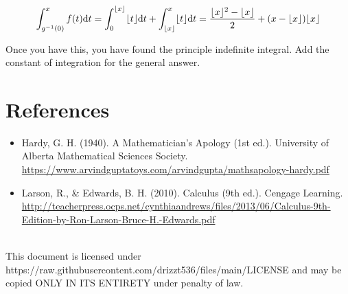 \documentclass[12pt]{article}
\begin{document}
		\begin{align*}
			\int_{g^{-1}(0)}^xf(t)\text dt
			= \int_{0}^{\lfloor x\rfloor}\lfloor t\rfloor\text dt+\int_{\lfloor x\rfloor}^x\lfloor t\rfloor\text dt
			= \frac{\lfloor x\rfloor^2-\lfloor x\rfloor}2+(x-\lfloor x\rfloor)\lfloor x\rfloor
		\end{align*}

		Once you have this, you have found the principle indefinite integral. Add the constant of integration
		for the general answer.


\section*{References}
	\begin{itemize}
		\item Hardy, G. H. (1940). A Mathematician's Apology (1st ed.). University of Alberta Mathematical Sciences Society.\\
			\url{https://www.arvindguptatoys.com/arvindgupta/mathsapology-hardy.pdf}\\

		\item Larson, R., & Edwards, B. H. (2010). Calculus (9th ed.). Cengage Learning.\\
			\url{http://teacherpress.ocps.net/cynthiaandrews/files/2013/06/Calculus-9th-Edition-by-Ron-Larson-Bruce-H.-Edwards.pdf}
	\end{itemize}
	\vspace{28em}\\
	This document is licensed under https://raw.githubusercontent.com/drizzt536/files/main/LICENSE
	and may be copied ONLY IN ITS ENTIRETY under penalty of law.
\end{document}
